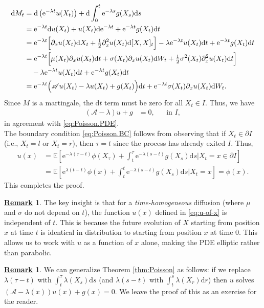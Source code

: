 \documentclass[12pt]{book}
\let\varphi\phi
\numberwithin{equation}{chapter}
\theoremstyle{plain}
\numberwithin{theorem}{section}
\theoremstyle{definition}
\newtheorem{remark}[theorem]{\underline{Remark}}
\numberwithin{exercise}{chapter}
\let\oldendproof\endproof
\renewenvironment{proof}[1][\proofname]{%
  \oldproof[\scshape\underline{#1}]%
}{\oldendproof}
\newcommand{\<}{\langle}
\renewcommand{\>}{\rangle}
\renewcommand{\(}{\left(}
\renewcommand{\)}{\right)}
\renewcommand{\[}{\left[}
\renewcommand{\]}{\right]}
\newcommand\Eb{\mathds{E}}
\newcommand\Ac{\mathscr{A}}
\newcommand\sig{\sigma}
\newcommand\lam{\lambda}
\renewcommand\d{\partial}
\newcommand\dd{\mathrm{d}}
\newcommand\ee{\mathrm{e}}
\begin{document}
\begin{proof}
\begin{align}
\dd M_t
	&=	\dd  \( \ee^{-\lam t} u(X_t) \) + \dd \int_0^t \ee^{-\lam s} g(X_s) \dd s \\
	&=	\ee^{-\lam t} \dd u(X_t) + u(X_t) \dd \ee^{-\lam t} + \ee^{-\lam t} g(X_t) \dd t \\
	&=	\ee^{- \lam t} \Big[ \d_x u(X_t) \dd X_t + \tfrac{1}{2} \d_x^2 u(X_t) \dd [X,X]_t \Big] - \lam \ee^{-\lam t} u(X_t) \dd t + \ee^{-\lam t} g(X_t) \dd t \\
	&=	\ee^{- \lam t} \Big[ \mu(X_t) \d_x u(X_t) \dd t + \sig(X_t) \d_x u(X_t) \dd W_t + \tfrac{1}{2} \sig^2(X_t) \d_x^2 u(X_t) \dd t \Big] \notag \\
	&\quad - \lam \ee^{-\lam t} u(X_t) \dd t + \ee^{-\lam t} g(X_t) \dd t \\
	&=	\ee^{- \lam t} \Big( \Ac u(X_t) - \lam u(X_t) + g(X_t) \Big) \dd t + \ee^{- \lam t} \sig(X_t) \d_x u(X_t) \dd W_t .
\end{align}
Since $M$ is a martingale, the $\dd t$ term must be zero for all $X_t \in I$.  Thus, we have
\begin{align}
(\Ac - \lam ) u + g
	&=	0 , &
	&\text{in $I$} , 
\end{align}
in agreement with \eqref{eq:Poisson.PDE}.  
\\[0.5em]
The boundary condition \eqref{eq:Poisson.BC} follows from observing that if $X_t \in \d I$ (i.e., $X_t = l$ or $X_t = r$), then $\tau = t$ since the process has already exited $I$.  Thus,
\begin{align}
u(x)
	&=	\Eb[ \ee^{-\lam(\tau-t)}\varphi(X_\tau) + \int_t^\tau \ee^{-\lam(s-t)}g(X_s) \dd s | X_t = x \in \d I] \\
	&=	\Eb[ \ee^{\lam(t-t)}\varphi(x) + \int_t^t \ee^{-\lam(s-t)}g(X_s) \dd s | X_t = x ]
	=		\varphi(x) .
\end{align}
This completes the proof.
\end{proof}

\begin{remark}
The key insight is that for a \emph{time-homogeneous} diffusion (where $\mu$ and $\sig$ do not depend on $t$), the function $u(x)$ defined in \eqref{eq:u-of-x} is independent of $t$. This is because the future evolution of $X$ starting from position $x$ at time $t$ is identical in distribution to starting from position $x$ at time $0$.  This allows us to work with $u$ as a function of $x$ alone, making the PDE elliptic rather than parabolic.
\end{remark}

\begin{remark}
We can generalize Theorem \ref{thm:Poisson} as follows: if we replace $\lam(\tau-t)$ with $\int_t^\tau \lam(X_s) \dd s$ (and $\lam(s-t)$ with $\int_t^s \lam(X_r) \dd r$) then $u$ solves $(\Ac - \lam(x) ) u(x) + g(x) = 0$.  We leave the proof of this as an exercise for the reader.
\end{remark}
\end{document}
